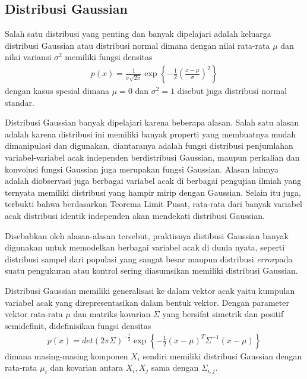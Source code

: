 \subsection{Distribusi Gaussian}

Salah satu distribusi yang penting dan banyak dipelajari adalah keluarga distribusi Gaussian atau distribusi normal dimana dengan nilai rata-rata $\mu$ dan nilai variansi $\sigma^2$ memiliki fungsi densitas
\begin{align}
    p(x) = \frac{1}{\sigma \sqrt{2\pi}} \exp\left\{-\frac{1}{2}\left(\frac{x-\mu}{\sigma}\right)^2\right\}
\end{align}
dengan kasus spesial dimana $\mu = 0$ dan $\sigma^2 = 1$ disebut juga distribusi normal standar.

Distribusi Gaussian banyak dipelajari karena beberapa alasan. Salah satu alasan adalah karena distribusi ini memiliki banyak properti yang membuatnya mudah dimanipulasi dan digunakan, diantaranya adalah fungsi distribusi penjumlahan variabel-variabel acak independen berdistribusi Gaussian, maupun perkalian dan konvolusi fungsi Gaussian juga merupakan fungsi Gaussian. Alasan lainnya adalah diobservasi juga berbagai variabel acak di berbagai pengujian ilmiah yang ternyata memiliki distribusi yang hampir mirip dengan Gaussian. Selain itu juga, terbukti bahwa berdasarkan Teorema Limit Pusat, rata-rata dari banyak variabel acak distribusi identik independen akan mendekati distribusi Gaussian. \citep{degroot2012}

Disebabkan oleh alasan-alasan tersebut, praktisnya distibusi Gaussian banyak digunakan untuk memodelkan berbagai variabel acak di dunia nyata, seperti distribusi sampel dari populasi yang sangat besar maupun distribusi \textit{error}pada suatu pengukuran atau kontrol sering diasumsikan memiliki distribusi Gaussian.

Distribusi Gaussian memiliki generalisasi ke dalam vektor acak yaitu kumpulan variabel acak yang direpresentasikan dalam bentuk vektor. Dengan parameter vektor rata-rata $\mu$ dan matriks kovarian $\Sigma$ yang bersifat simetrik dan positif semidefinit, didefinisikan fungsi densitas
\begin{align}
    p(x) = det(2 \pi \Sigma)^{-\frac{1}{2}} \exp\left\{-\frac{1}{2}(x-\mu)^T \Sigma^{-1} (x-\mu)\right\}
\end{align}
dimana masing-masing komponen $X_i$ sendiri memiliki distribusi Gaussian dengan rata-rata $\mu_i$ dan kovarian antara $X_i, X_j$ sama dengan $\Sigma_{i,j}$.

